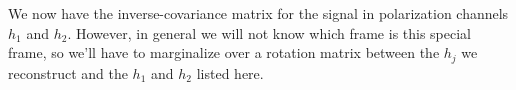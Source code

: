 \documentclass[10pt]{article}
\begin{document}
We now have the inverse-covariance matrix for the signal in polarization channels $h_1$ and $h_2$. However, in general we will not know which frame is this special frame, so we'll have to marginalize over a rotation matrix between the $h_j$ we reconstruct and the $h_1$ and $h_2$ listed here. 

\begin{comment}
Furthermore, we can apply additional constraints on the polarization of the graviational wave signal. In particular, we can write the gaussian prior in a different basis. For example, we can write the prior for a linearly-polarized signal as

\begin{eqnarray}
\log p(h) & = & - \begin{bmatrix} h_1+h_2 & h_1-h_2 \end{bmatrix}^\ast \begin{bmatrix} \sigma_a^{-2} & 0 \\ 0 & \sigma_b^{-2} \end{bmatrix} \begin{bmatrix} h_1+h_2 \\ h_1-h_2 \end{bmatrix} \\
          & = & - \begin{bmatrix} h_1 & h_2 \end{bmatrix}^\ast \begin{bmatrix} 1 & 1 \\ 1 & -1 \end{bmatrix} \begin{bmatrix} \sigma_a^{-2} & 0 \\ 0 & \sigma_b^{-2} \end{bmatrix} \begin{bmatrix} 1 & 1 \\ 1 & -1 \end{bmatrix} \begin{bmatrix} h_1 \\ h_2 \end{bmatrix} \\
          & = & - \begin{bmatrix} h_1 & h_2 \end{bmatrix}^\ast \begin{bmatrix} \sigma_a^{-2}+\sigma_b^{-2} & \sigma_a^{-2}-\sigma_b^{-2} \\ \sigma_a^{-2}-\sigma_b^{-2}  & \sigma_a^{-2}+\sigma_b^{-2}  \end{bmatrix} \begin{bmatrix} h_1 \\ h_2 \end{bmatrix} \\
\end{eqnarray}


\end{comment}
\end{document}
